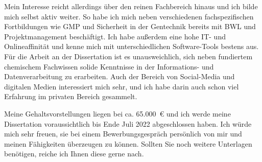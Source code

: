 Mein Interesse reicht allerdings über den reinen Fachbereich hinaus und ich bilde mich selbst aktiv weiter. So habe ich mich neben verschiedenen fachspezifischen Fortbildungen wie GMP und Sicherheit in der Gentechnik bereits mit BWL und Projektmanagement beschäftigt. Ich habe außerdem eine hohe IT- und Onlineaffinität und kenne mich mit unterschiedlichen Software-Tools bestens aus. Für die Arbeit an der Dissertation ist es unausweichlich, sich neben fundiertem chemischem Fachwissen solide Kenntnisse in der Informations- und Datenverarbeitung zu erarbeiten. Auch der Bereich von Social-Media und digitalen Medien interessiert mich sehr, und ich habe darin auch schon viel Erfahrung im privaten Bereich gesammelt.\par

Meine Gehaltsvorstellungen liegen bei ca. 65.000~\euro{} und ich werde meine Dissertation voraussichtlich bis Ende Juli 2022 abgeschlossen haben. Ich würde mich sehr freuen, sie bei einem Bewerbungsgespräch persönlich von mir und meinen Fähigkeiten überzeugen zu können. Sollten Sie noch weitere Unterlagen benötigen, reiche ich Ihnen diese gerne nach.\par\vspace{1em}



\makeletterclosing

